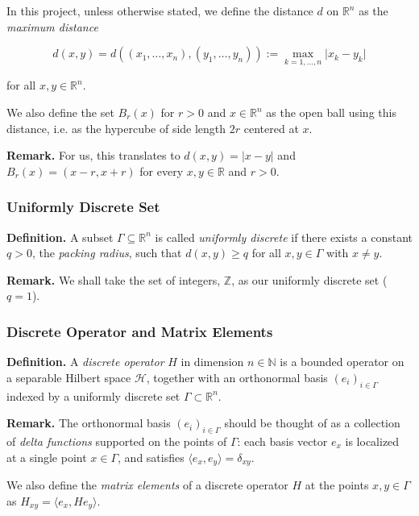 \documentclass[11pt]{article}
\begin{document}
In this project, unless otherwise stated, we define the distance $d$ on $\mathbb{R}^n$ as the \textit{maximum distance}

\begin{equation}
    d(x, y) = d((x_1, \dots, x_n), (y_1, \dots, y_n)) := \max_{k=1, \dots, n} \vert x_k - y_k \vert
\end{equation}

for all $x, y \in \mathbb{R}^n$.

We also define the set $B_r (x)$ for $r > 0$ and $x \in \mathbb{R}^n$ as the open ball using this distance, i.e. as the hypercube of side length $2r$ centered at $x$.

\textbf{Remark.} For us, this translates to $d(x, y) = \vert x - y \vert$ and $B_r (x) = (x - r, x + r)$ for every $x, y \in \mathbb{R}$ and $r > 0$.

\subsubsection{Uniformly Discrete Set}

\textbf{Definition.} A subset $\Gamma \subseteq \mathbb{R}^n$ is called \textit{uniformly discrete} if there exists a constant $q > 0$, the \textit{packing radius}, such that $d(x, y) \ge q$ for all $x, y \in \Gamma$ with $x \ne y$.

\textbf{Remark.} We shall take the set of integers, $\mathbb{Z}$, as our uniformly discrete set ($q = 1$).

\subsubsection{Discrete Operator and Matrix Elements}

\textbf{Definition.} A \textit{discrete operator} $H$ in dimension $n \in \mathbb{N}$ is a bounded operator on a separable Hilbert space $\mathcal{H}$, together with an orthonormal basis $(e_i)_{i \in \Gamma}$ indexed by a uniformly discrete set $\Gamma \subset \mathbb{R}^n$. 

\textbf{Remark.} The orthonormal basis $(e_i)_{i \in \Gamma}$ should be thought of as a collection of \textit{delta functions} supported on the points of $\Gamma$: each basis vector $e_x$ is localized at a single point $x \in \Gamma$, and satisfies $\langle e_x, e_y \rangle = \delta_{xy}$.

We also define the \textit{matrix elements} of a discrete operator $H$ at the points $x, y \in \Gamma$ as $H_{xy} = \langle e_x, H e_y \rangle$.
\end{document}
